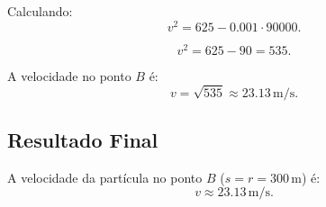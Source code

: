 Calculando:
\[
v^2 = 625 - 0.001 \cdot 90000.
\]

\[
v^2 = 625 - 90 = 535.
\]

A velocidade no ponto \(B\) é:
\[
v = \sqrt{535} \approx 23.13 \, \text{m/s}.
\]

\subsection*{Resultado Final}
A velocidade da partícula no ponto \(B\) (\(s = r = 300 \, \text{m}\)) é:
\[
v \approx 23.13 \, \text{m/s}.
\]
